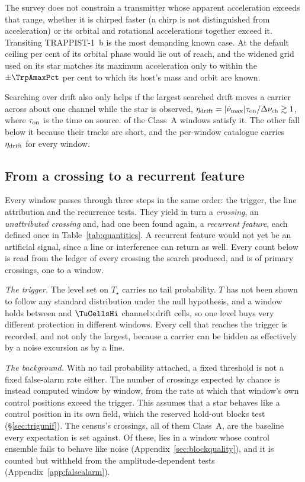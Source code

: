 The survey does not constrain a transmitter whose apparent
acceleration exceeds that range, whether it is chirped faster (a chirp is
not distinguished from acceleration) or its orbital and
rotational accelerations together exceed it. Transiting TRAPPIST-1~b is the
most demanding known case. At the default ceiling \TrapPhaseHi{} per cent of
its orbital phase would lie out of reach, and the widened grid used on its
star matches its maximum acceleration only to within the $\pm\TrpAmaxPct$ per
cent to which its host's mass and orbit are known.

Searching over drift also only helps if the largest searched drift moves a
carrier across about one channel while the star is observed,
$\eta_{\rm drift}=|\dot\nu_{\max}|\tau_{\rm on}/\Delta\nu_{\rm ch}\gtrsim1$,
where $\tau_{\rm on}$ is the time on source. \EtaDriftAOk{} of the \NWinA{}
Class~A windows satisfy it. The other \EtaDriftALo{} fall below it because
their tracks are short, and the per-window catalogue carries
$\eta_{\rm drift}$ for every window.

\subsection{From a crossing to a recurrent feature}
\label{sec:summary}

Every window passes through three steps in the same order: the trigger, the
line attribution and the recurrence tests. They yield in turn a
\emph{crossing}, an \emph{unattributed crossing} and, had one been found
again, a \emph{recurrent feature}, each defined once in
Table~\ref{tab:quantities}. A recurrent feature would not yet be an
artificial signal, since a line or interference can return as well.
Every count below is read from the ledger of every crossing the search
produced, and is of primary crossings, one to a window.

\emph{The trigger.} The level set on $T_\star$ carries no tail probability.
$T$ has not been shown to follow any standard distribution under the null
hypothesis, and a window holds between \TuCellsLo{} and $\TuCellsHi$
channel$\times$drift cells, so one level buys very different protection in
different windows. Every cell that reaches the trigger is recorded, and not
only the largest, because a carrier can be hidden as effectively by a noise
excursion as by a line.

\emph{The background.} With no tail probability attached, a fixed threshold
is not a fixed false-alarm rate either. The number of crossings expected by chance is instead computed window
by window, from the rate at which that window's own control positions exceed
the trigger. This assumes that a star behaves like a control position in its
own field, which the reserved hold-out blocks test (\S\ref{sec:trigunif}).
The census's \CsNCrossQp{} crossings, all of them Class~A, are the baseline
every expectation is set against. Of these, \BkFlagNCrossOtherWord{} lies in a
window whose control ensemble fails to behave like noise
(Appendix~\ref{sec:blockquality}), and it is counted but withheld from the
amplitude-dependent tests (Appendix~\ref{app:falsealarm}).

